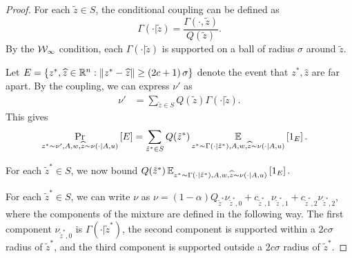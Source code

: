 \begin{proof}
    For each $\tilde{z} \in S$, the conditional coupling can be defined as
    \[
    \Gamma( \cdot | \tilde{z}) = \frac{\Gamma( \cdot, \tilde{z})}{Q(\tilde{z})}.
    \]
    By the $\mathcal W_\infty$ condition, each $\Gamma( \cdot | \tilde{z})$ is supported on a ball of radius $\sigma$ around $\tilde{z}$.

    Let $ E = \{ z^*, \widehat{z} \in \mathbb{R}^n: \| z^* - \widehat{z}\| \geq \left( 2c+1 \right)\sigma\}$ denote the event that $z^*, \widehat{z}$ are far apart.
  By the coupling, we can express $\nu'$ as 
  \begin{align*}
    \nu' &= \sum_{\tilde{z} \in S} Q(\tilde{z}) \Gamma( \cdot | \tilde{z}).
  \end{align*}
  This gives 
  \begin{align*} 
    \Pr_{z^* \sim \nu', A , w, \widehat{z} \sim \nu(\cdot | A, u)} \left[ E \right] & = \sum_{\tilde{z}^* \in S} Q ( \tilde{z}^*) \operatorname*{\mathbb{E}}_{z^*\sim \Gamma( \cdot | \tilde{z}^*) , A , w, \widehat{z} \sim \nu(\cdot | A, u) } \left[ {1}_E \right].
  \end{align*}
  
    For each $\tilde{z}^* \in S$, we now bound $Q ( \tilde{z}^*) \operatorname*{\mathbb{E}}_{z^*\sim \Gamma( \cdot | \tilde{z}^*) , A , w, \widehat{z} \sim \nu(\cdot | A, u) } \left[ {1}_E \right].$ 

		For each $\tilde{z}^* \in S$, we can write $\nu$ as $\nu = \left( 1- \alpha \right) Q_{\tilde{z}^*} \nu_{\tilde{z}^*, 0} + c_{\tilde{z}^*, 1 } \nu_{\tilde{z}^*, 1} + c_{\tilde{z}^*,2} \nu_{\tilde{z}^*,2}$, where the components of the mixture are defined in the following way. The first component $\nu_{\tilde{z}^*,0}$ is $\Gamma( \cdot | \tilde{z}^*)$, the second component is supported within a $2 c \sigma$ radius of $\tilde{z}^*$, and the third component is supported outside a $2 c \sigma $ radius of $\tilde{z}^*$.


\end{proof}

